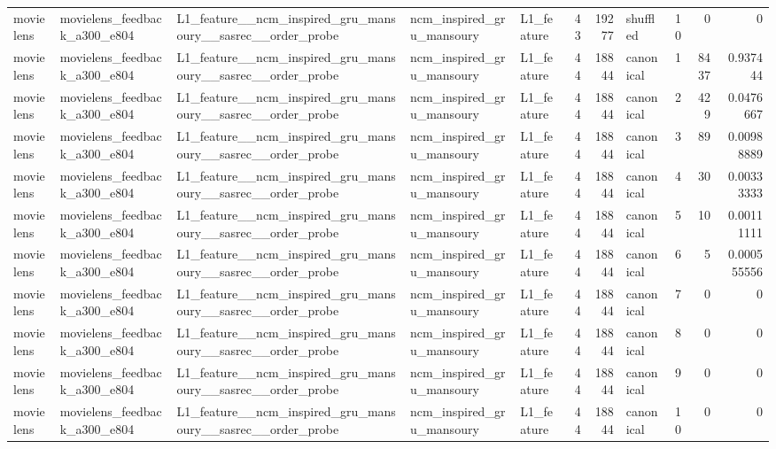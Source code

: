 \begin{table}[htbp!]
\begin{tabular}{lllllrrlrrr}
movielens & movielens\_feedback\_a300\_e804 & L1\_feature\_\_ncm\_inspired\_gru\_mansoury\_\_sasrec\_\_order\_probe & ncm\_inspired\_gru\_mansoury & L1\_feature & 43 & 19277 & shuffled & 10 & 0 & 0 \\
movielens & movielens\_feedback\_a300\_e804 & L1\_feature\_\_ncm\_inspired\_gru\_mansoury\_\_sasrec\_\_order\_probe & ncm\_inspired\_gru\_mansoury & L1\_feature & 44 & 18844 & canonical & 1 & 8437 & 0.937444 \\
movielens & movielens\_feedback\_a300\_e804 & L1\_feature\_\_ncm\_inspired\_gru\_mansoury\_\_sasrec\_\_order\_probe & ncm\_inspired\_gru\_mansoury & L1\_feature & 44 & 18844 & canonical & 2 & 429 & 0.0476667 \\
movielens & movielens\_feedback\_a300\_e804 & L1\_feature\_\_ncm\_inspired\_gru\_mansoury\_\_sasrec\_\_order\_probe & ncm\_inspired\_gru\_mansoury & L1\_feature & 44 & 18844 & canonical & 3 & 89 & 0.00988889 \\
movielens & movielens\_feedback\_a300\_e804 & L1\_feature\_\_ncm\_inspired\_gru\_mansoury\_\_sasrec\_\_order\_probe & ncm\_inspired\_gru\_mansoury & L1\_feature & 44 & 18844 & canonical & 4 & 30 & 0.00333333 \\
movielens & movielens\_feedback\_a300\_e804 & L1\_feature\_\_ncm\_inspired\_gru\_mansoury\_\_sasrec\_\_order\_probe & ncm\_inspired\_gru\_mansoury & L1\_feature & 44 & 18844 & canonical & 5 & 10 & 0.00111111 \\
movielens & movielens\_feedback\_a300\_e804 & L1\_feature\_\_ncm\_inspired\_gru\_mansoury\_\_sasrec\_\_order\_probe & ncm\_inspired\_gru\_mansoury & L1\_feature & 44 & 18844 & canonical & 6 & 5 & 0.000555556 \\
movielens & movielens\_feedback\_a300\_e804 & L1\_feature\_\_ncm\_inspired\_gru\_mansoury\_\_sasrec\_\_order\_probe & ncm\_inspired\_gru\_mansoury & L1\_feature & 44 & 18844 & canonical & 7 & 0 & 0 \\
movielens & movielens\_feedback\_a300\_e804 & L1\_feature\_\_ncm\_inspired\_gru\_mansoury\_\_sasrec\_\_order\_probe & ncm\_inspired\_gru\_mansoury & L1\_feature & 44 & 18844 & canonical & 8 & 0 & 0 \\
movielens & movielens\_feedback\_a300\_e804 & L1\_feature\_\_ncm\_inspired\_gru\_mansoury\_\_sasrec\_\_order\_probe & ncm\_inspired\_gru\_mansoury & L1\_feature & 44 & 18844 & canonical & 9 & 0 & 0 \\
movielens & movielens\_feedback\_a300\_e804 & L1\_feature\_\_ncm\_inspired\_gru\_mansoury\_\_sasrec\_\_order\_probe & ncm\_inspired\_gru\_mansoury & L1\_feature & 44 & 18844 & canonical & 10 & 0 & 0 \\

\end{tabular}
\end{table}
